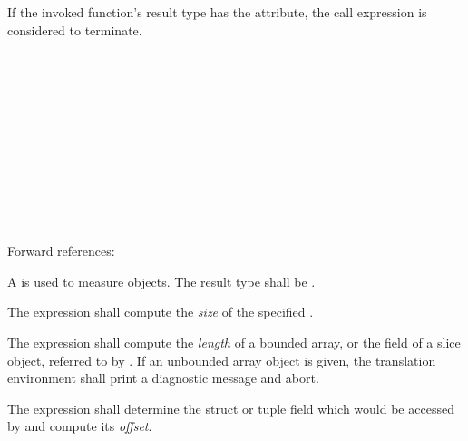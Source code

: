\specsubsubitem
If the invoked function's result type has the  attribute,
the call expression is considered to terminate.


\begin{grammar}
 \\
	 \\
	 \\
	 \\

 \\
	 \terminal{(}  \terminal{)} \\

 \\
	 \terminal{(}  \terminal{)} \\

 \\
	 \terminal{(}  \terminal{)} \\
\end{grammar}

Forward references: 

\specsubsubitem
A  is used to measure objects. The result
type shall be .

\specsubsubitem
The  expression shall compute the \textit{size} of the specified
.

\specsubsubitem
The  expression shall compute the \textit{length} of a bounded
array, or the  field of a slice object, referred to by
. If an unbounded array object is given, the translation
environment shall print a diagnostic message and abort.

\specsubsubitem
The  expression shall determine the struct or tuple field
which would be accessed by  and compute
its \textit{offset}.


\begin{grammar}
 \\
	   \\
	   \\
\end{grammar}

